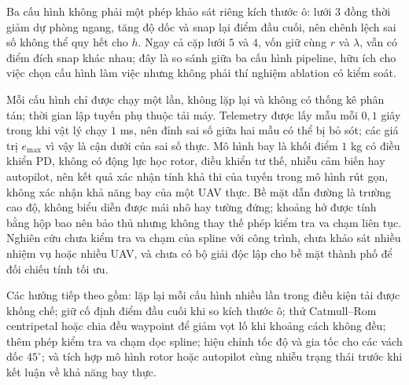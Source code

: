 Ba cấu hình không phải một phép khảo sát riêng kích thước ô: lưới $3$ đồng thời
giảm dự phòng ngang, tăng độ dốc và snap lại điểm đầu cuối, nên chênh lệch sai số
không thể quy hết cho $h$. Ngay cả cặp lưới $5$ và $4$, vốn giữ cùng $r$ và
$\lambda$, vẫn có điểm đích snap khác nhau; đây là so sánh giữa ba cấu hình
pipeline, hữu ích cho việc chọn cấu hình làm việc nhưng không phải thí nghiệm
ablation có kiểm soát.

Mỗi cấu hình chỉ được chạy một lần, không lặp lại và không có thống kê phân tán;
thời gian lập tuyến phụ thuộc tải máy. Telemetry được lấy mẫu mỗi $0{,}1$ giây
trong khi vật lý chạy $1$ ms, nên đỉnh sai số giữa hai mẫu có thể bị bỏ sót; các
giá trị $e_{\max}$ vì vậy là cận dưới của sai số thực. Mô hình bay là khối điểm $1$ kg có điều
khiển PD, không có động lực học rotor, điều khiển tư thế, nhiễu cảm biến hay
autopilot, nên kết quả xác nhận tính khả thi của tuyến trong mô hình rút gọn,
không xác nhận khả năng bay của một UAV thực. Bề mặt dẫn đường là trường cao độ,
không biểu diễn được mái nhô hay tường đứng; khoảng hở được tính bằng hộp bao nên
bảo thủ nhưng không thay thế phép kiểm tra va chạm liên tục. Nghiên cứu chưa kiểm
tra va chạm của spline với công trình, chưa khảo sát nhiều nhiệm vụ hoặc nhiều
UAV, và chưa có bộ giải độc lập cho bề mặt thành phố để đối chiếu tính tối ưu.

Các hướng tiếp theo gồm: lặp lại mỗi cấu hình nhiều lần trong điều kiện tải được
khống chế; giữ cố định điểm đầu cuối khi so kích thước ô; thử Catmull--Rom
centripetal hoặc chia đều waypoint để giảm vọt lố khi khoảng cách không đều; thêm
phép kiểm tra va chạm dọc spline; hiệu chỉnh tốc độ và gia tốc cho các vách dốc $45^\circ$; và tích
hợp mô hình rotor hoặc autopilot cùng nhiễu trạng thái trước khi kết luận về khả
năng bay thực.
